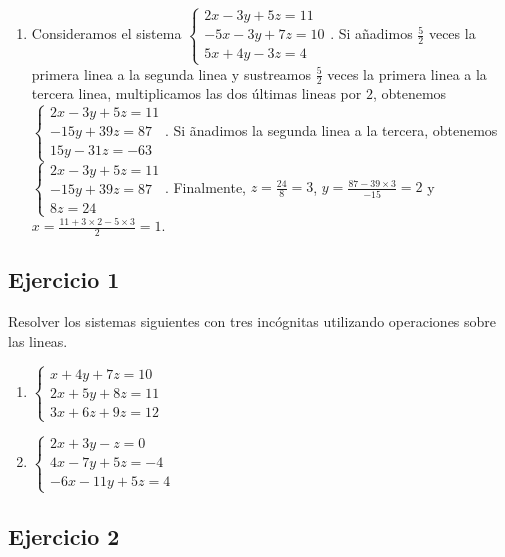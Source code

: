 \begin{enumerate}
\item Consideramos el sistema
  $\left\{
\begin{aligned}
  2x - 3y +5z = 11 \\
  -5x - 3y + 7z = 10 \\
  5x + 4y - 3z = 4
\end{aligned}\right.$. Si añadimos $\frac{5}{2}$ veces la primera linea a la
segunda linea y sustreamos $\frac{5}{2}$ veces la primera linea a la
tercera linea, multiplicamos las dos últimas lineas por $2$, obtenemos
$\left\{
\begin{aligned}
  2x - 3y +5z = 11 \\
  -15y + 39z = 87 \\
 15y - 31z = -63
\end{aligned}\right.$. Si ãnadimos la segunda linea a la tercera, obtenemos
$\left\{
\begin{aligned}
  2x - 3y +5z = 11 \\
  -15y + 39z = 87 \\
   8z = 24
\end{aligned}\right.$. Finalmente, $z = \frac{24}{8} = 3$,
$y = \frac{87 - 39 \times 3}{-15} = 2$ y
$x = \frac{11 + 3 \times 2 - 5 \times 3}{2} = 1$.
\end{enumerate}

\subsection*{Ejercicio 1}

Resolver los sistemas siguientes con tres incógnitas utilizando operaciones
sobre las lineas.

\begin{enumerate}
\item $\left\{
\begin{aligned}
  x + 4y + 7z = 10 \\
  2x + 5y + 8z = 11 \\
 3x + 6z +9z = 12
\end{aligned}\right.$
\item $\left\{
\begin{aligned}
  2x + 3y - z = 0 \\
  4x - 7y + 5z = -4 \\
  -6x -11y + 5z = 4
\end{aligned}\right.$
\end{enumerate}

\subsection*{Ejercicio 2}

